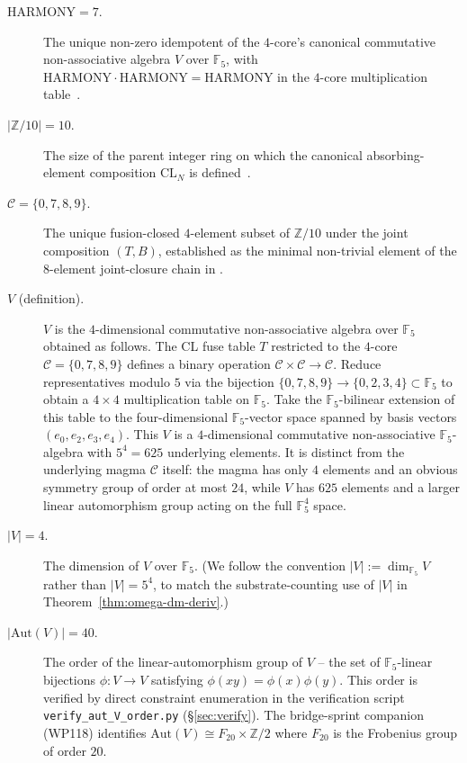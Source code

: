 \documentclass[11pt,reqno]{amsart}
\theoremstyle{plain}
\theoremstyle{definition}
\theoremstyle{remark}
\newcommand{\Z}{\mathbb{Z}}
\newcommand{\F}{\mathbb{F}}
\newcommand{\Aut}{\mathrm{Aut}}
\begin{document}
\begin{description}
\item[$\mathrm{HARMONY} = 7$.] The unique non-zero idempotent of
the $4$-core's canonical commutative non-associative algebra
$V$ over $\F_5$, with $\mathrm{HARMONY} \cdot \mathrm{HARMONY} =
\mathrm{HARMONY}$ in the $4$-core multiplication
table~\cite{SandersGish2026FourCore}.
\item[$|\Z/10| = 10$.] The size of the parent integer ring on
which the canonical absorbing-element composition $\mathrm{CL}_N$
is defined~\cite{SandersGish2026JCAP}.
\item[$\mathcal{C} = \{0, 7, 8, 9\}$.] The unique fusion-closed
$4$-element subset of $\Z/10$ under the joint composition
$(T, B)$, established as the minimal non-trivial element of the
$8$-element joint-closure chain in
\cite{SandersGish2026FourCore}.
\item[$V$ (definition).] $V$ is the $4$-dimensional commutative
non-associative algebra over $\F_5$ obtained as follows. The CL
fuse table $T$ restricted to the $4$-core
$\mathcal{C} = \{0, 7, 8, 9\}$ defines a binary operation
$\mathcal{C} \times \mathcal{C} \to \mathcal{C}$. Reduce
representatives modulo $5$ via the bijection
$\{0, 7, 8, 9\} \to \{0, 2, 3, 4\} \subset \F_5$ to obtain a
$4 \times 4$ multiplication table on $\F_5$. Take the
$\F_5$-bilinear extension of this table to the four-dimensional
$\F_5$-vector space spanned by basis vectors $(e_0, e_2, e_3, e_4)$.
This $V$ is a $4$-dimensional commutative non-associative
$\F_5$-algebra with $5^4 = 625$ underlying elements. It is
distinct from the underlying magma $\mathcal{C}$ itself: the
magma has only $4$ elements and an obvious symmetry group of
order at most $24$, while $V$ has $625$ elements and a larger
linear automorphism group acting on the full $\F_5^{4}$ space.
\item[$|V| = 4$.] The dimension of $V$ over $\F_5$. (We follow
the convention $|V| := \dim_{\F_5} V$ rather than $|V| = 5^4$,
to match the substrate-counting use of $|V|$ in
Theorem~\ref{thm:omega-dm-deriv}.)
\item[$|\Aut(V)| = 40$.] The order of the linear-automorphism
group of $V$ -- the set of $\F_5$-linear bijections
$\phi: V \to V$ satisfying $\phi(xy) = \phi(x)\phi(y)$. This
order is verified by direct constraint enumeration in the
verification script
\texttt{verify\_aut\_V\_order.py} (\S\ref{sec:verify}).
The bridge-sprint companion~\cite{SandersClaudeChat2026BridgeSprint}
(WP118) identifies $\Aut(V) \cong F_{20} \times \Z/2$ where
$F_{20}$ is the Frobenius group of order $20$.


\end{description}
\end{document}
